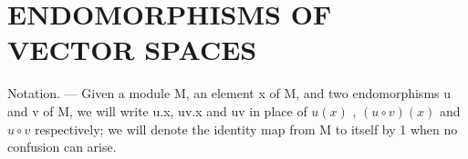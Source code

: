 \section{ENDOMORPHISMS OF VECTOR SPACES}

Notation. --- Given a module M, an element x of M, and two endomorphisms u and v of M, we will write u.x, uv.x and uv in place of \(u(x)\) , \((u \circ v)(x)\) and \(u \circ v\) respectively; we will denote the identity map from M to itself by 1 when no confusion can arise.

